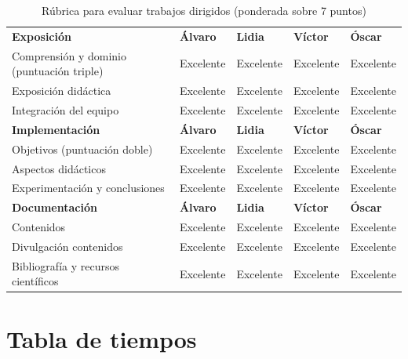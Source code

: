 \documentclass[a4paper]{article}
\begin{document}
\begin{table}[htbp]
  \centering
  \scriptsize
  \renewcommand{\arraystretch}{1.5}
  \setlength{\tabcolsep}{4pt}
  \begin{tabular}{|>{\raggedright\arraybackslash}p{2.8cm}|>{\raggedright\arraybackslash}p{3cm}|>{\raggedright\arraybackslash}p{3cm}|>{\raggedright\arraybackslash}p{3cm}|>{\raggedright\arraybackslash}p{3cm}|}
  \hline
  \multicolumn{5}{|c|}{\textbf{Rúbrica para evaluar los trabajos dirigidos}} \\
  \hline
  \textbf{Exposición} &  \textbf{Álvaro} & \textbf{Lidia} & \textbf{Víctor} & \textbf{Óscar} \\
  \hline
  Comprensión y dominio (puntuación triple)& Excelente & Excelente & Excelente & Excelente \\
  \hline
  Exposición didáctica & Excelente & Excelente & Excelente & Excelente\\
  \hline
  Integración del equipo & Excelente & Excelente & Excelente & Excelente \\
  \hline
  \textbf{Implementación} & \textbf{Álvaro} & \textbf{Lidia} & \textbf{Víctor} & \textbf{Óscar} \\
  \hline
  Objetivos (puntuación doble)& Excelente & Excelente & Excelente & Excelente \\
  \hline
  Aspectos didácticos & Excelente & Excelente & Excelente & Excelente \\
  \hline
  Experimentación y conclusiones & Excelente & Excelente & Excelente & Excelente \\
  \hline
  \textbf{Documentación} & \textbf{Álvaro} & \textbf{Lidia} & \textbf{Víctor} & \textbf{Óscar} \\
  \hline
  Contenidos & Excelente & Excelente & Excelente & Excelente \\
  \hline
  Divulgación contenidos & Excelente & Excelente & Excelente & Excelente \\
  \hline
  Bibliografía y recursos científicos & Excelente & Excelente & Excelente & Excelente \\
  \hline
  \end{tabular}
  \caption{Rúbrica para evaluar trabajos dirigidos (ponderada sobre 7 puntos)}
  \end{table}

  \newpage

\section{Tabla de tiempos}
\end{document}
